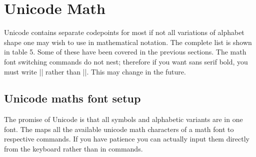 \newcommand\showlbrace[3]{\par\noindent\hangindent=6em%
  \makebox[5em][l]{$\Biggl#1\biggl#1\Bigl#1\bigl#1#1$}\makebox[3.5em][l]{\small\texttt{U+#2}} \cmd{#1}$^{#3}$}

\newcommand\showrbrace[3]{\par\noindent\hangindent=6em%
  \makebox[5em][l]{$#1\bigr#1\Bigr#1\biggr#1\Biggr#1$}\makebox[3.5em][l]{\small\texttt{U+#2}} \cmd{#1}$^{#3}$}

\newcommand\showwideaccent[3]{\par\noindent\hangindent=4em%
  \makebox[3em][l]{$#1{xxx}$}\makebox[3.5em][l]{\small\texttt{U+#2}} \cmd{#1}$^{#3}$
  \indexmathcmd [Math accents] {#1{abc}}
  }

\newcommand\showaccent[3]{\par\noindent\hangindent=4em%
  \makebox[3em][l]{$#1b$}\makebox[3.5em][l]{\small\texttt{U+#2}} \cmd{#1}$^{#3}$
  \indexmathcmd [Math accents] {#1 b}
  }
  
\newcommand\showover[3]{\par\noindent\hangindent=6em%
  \makebox[5em][l]{$#1{xxxxxx}$}\makebox[3.5em][l]{\small\texttt{U+#2}} \cmd{#1}$^{#3}$
  \indexmathcmd [Math over and under brackets] {#1{xxxxxx}}
  }
  
\chapter{Unicode Math}
Unicode contains separate codepoints for most if not all variations of alphabet
shape one may wish to use in mathematical notation. The complete list is shown
in table 5. Some of these have been covered in the previous sections.
The math font switching commands do not nest; therefore if you want sans
serif bold, you must write || rather than ||.
This may change in the future.

\section{Unicode maths font setup}

The promise of Unicode is that all symbols and alphabetic variants are in one font. The 
maps all the available unicode math characters of a math font to respective \latex commands. If you have patience you can actually input them directly from the keyboard rather than in commands.

